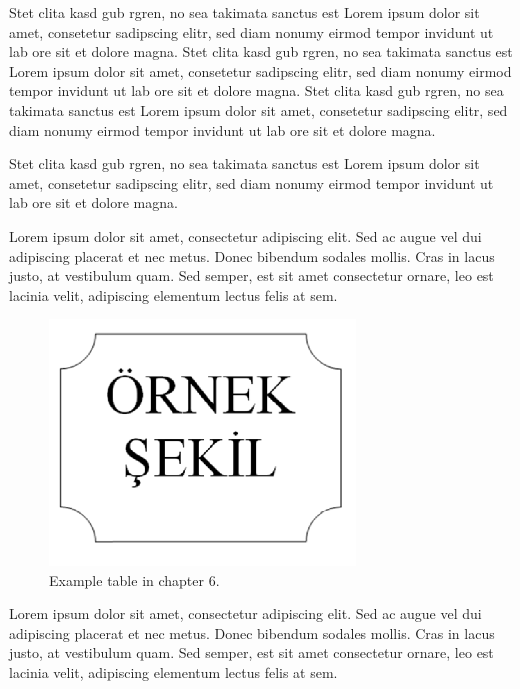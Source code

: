 Stet clita kasd gub rgren, no sea takimata sanctus est Lorem ipsum dolor sit amet, consetetur sadipscing elitr, sed diam nonumy eirmod tempor invidunt ut lab ore sit et dolore magna. Stet clita kasd gub rgren, no sea takimata sanctus est Lorem ipsum dolor sit amet, consetetur sadipscing elitr, sed diam nonumy eirmod tempor invidunt ut lab ore sit et dolore magna. Stet clita kasd gub rgren, no sea takimata sanctus est Lorem ipsum dolor sit amet, consetetur sadipscing elitr, sed diam nonumy eirmod tempor invidunt ut lab ore sit et dolore magna. 

Stet clita kasd gub rgren, no sea takimata sanctus est Lorem ipsum dolor sit amet, consetetur sadipscing elitr, sed diam nonumy eirmod tempor invidunt ut lab ore sit et dolore magna. 


Lorem ipsum dolor sit amet, consectetur adipiscing elit. Sed ac augue vel dui adipiscing placerat et nec metus. Donec bibendum sodales mollis. Cras in lacus justo, at vestibulum quam. Sed semper, est sit amet consectetur ornare, leo est lacinia velit, adipiscing elementum lectus felis at sem.

\begin{figure}
	\centering
	\includegraphics[width=230pt,keepaspectratio=true]{06_Chapter_6/fig/sekil7}
	\caption{Example table in chapter 6.}
	\label{Figure6.1}
\end{figure}

Lorem ipsum dolor sit amet, consectetur adipiscing elit. Sed ac augue vel dui adipiscing placerat et nec metus. Donec bibendum sodales mollis. Cras in lacus justo, at vestibulum quam. Sed semper, est sit amet consectetur ornare, leo est lacinia velit, adipiscing elementum lectus felis at sem.

